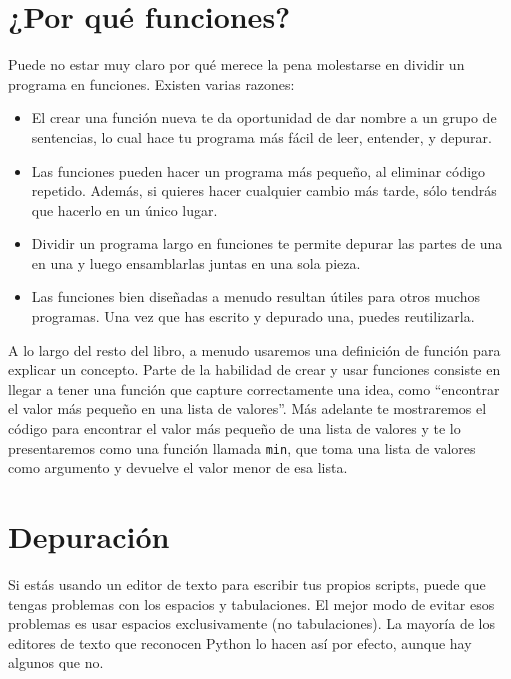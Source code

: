 \section{¿Por qué funciones?}

Puede no estar muy claro por qué merece la pena molestarse en dividir
un programa en funciones. Existen varias razones:

\begin{itemize}

\item El crear una función nueva te da oportunidad de dar nombre a un grupo
de sentencias, lo cual hace tu programa más fácil de leer, entender,
y depurar.

\item Las funciones pueden hacer un programa más pequeño, al eliminar código
repetido. Además, si quieres hacer cualquier cambio más tarde, sólo tendrás
que hacerlo en un único lugar.

\item Dividir un programa largo en funciones te permite depurar las
partes de una en una y luego ensamblarlas juntas en una sola pieza.

\item Las funciones bien diseñadas a menudo resultan útiles para otros muchos programas.
Una vez que has escrito y depurado una, puedes reutilizarla.

\end{itemize}

A lo largo del resto del libro, a menudo usaremos una definición de función para
explicar un concepto. Parte de la habilidad de crear y usar funciones consiste en llegar a
tener una función que capture correctamente una idea, como ``encontrar el valor
más pequeño en una lista de valores''. Más adelante te mostraremos el código para
encontrar el valor más pequeño de una lista de valores y te lo presentaremos como
una función llamada {\tt min}, que toma una lista de valores como argumento y
devuelve el valor menor de esa lista.


\section{Depuración}
\label{editor}

Si estás usando un editor de texto para escribir tus propios scripts, puede
que tengas problemas con los espacios y tabulaciones. El mejor modo de evitar
esos problemas es usar espacios exclusivamente (no tabulaciones). La mayoría
de los editores de texto que reconocen Python lo hacen así por efecto, aunque
hay algunos que no.

